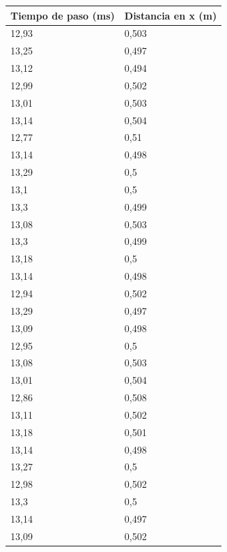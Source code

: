 \documentclass[a4paper]{article}
\begin{document}
\begin{table}[H]
    \centering
    \begin{tabular}{|l|l|}
    \hline
        Tiempo de paso (ms)  & Distancia en x (m)  \\ \hline
        12,93  & 0,503  \\ \hline
        13,25  & 0,497  \\ \hline
        13,12  & 0,494  \\ \hline
        12,99  & 0,502  \\ \hline
        13,01  & 0,503  \\ \hline
        13,14  & 0,504  \\ \hline
        12,77  & 0,51  \\ \hline
        13,14  & 0,498  \\ \hline
        13,29  & 0,5  \\ \hline
        13,1  & 0,5  \\ \hline
        13,3  & 0,499  \\ \hline
        13,08  & 0,503  \\ \hline
        13,3  & 0,499  \\ \hline
        13,18  & 0,5  \\ \hline
        13,14  & 0,498  \\ \hline
        12,94  & 0,502  \\ \hline
        13,29  & 0,497  \\ \hline
        13,09  & 0,498  \\ \hline
        12,95  & 0,5  \\ \hline
        13,08  & 0,503  \\ \hline
        13,01  & 0,504  \\ \hline
        12,86  & 0,508  \\ \hline
        13,11  & 0,502  \\ \hline
        13,18  & 0,501  \\ \hline
        13,14  & 0,498  \\ \hline
        13,27  & 0,5  \\ \hline
        12,98  & 0,502  \\ \hline
        13,3  & 0,5  \\ \hline
        13,14  & 0,497  \\ \hline
        13,09  & 0,502  \\ \hline
    \end{tabular}
\end{table}
\end{document}
